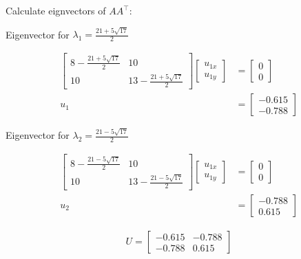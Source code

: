 \documentclass[11pt,letterpaper]{article}
\begin{document}
\begin{enumerate}
Calculate eignvectors of \( AA^\top \):

Eigenvector for \( \lambda_1 = \frac{21+5\sqrt{17}}{2} \)

\begin{align*}
    \begin{bmatrix}
        8-\frac{21+5\sqrt{17}}{2} & 10 \\
        10 & 13-\frac{21+5\sqrt{17}}{2}
    \end{bmatrix}
    \begin{bmatrix}
        u_{1x} \\ u_{1y}
    \end{bmatrix}
    &= \begin{bmatrix}
        0 \\ 0
    \end{bmatrix} \\
    u_1
    &= \begin{bmatrix}
        -0.615 \\ -0.788
    \end{bmatrix}
\end{align*}

Eigenvector for \( \lambda_2 = \frac{21-5\sqrt{17}}{2} \)

\begin{align*}
    \begin{bmatrix}
        8-\frac{21-5\sqrt{17}}{2} & 10 \\
        10 & 13-\frac{21-5\sqrt{17}}{2}
    \end{bmatrix}
    \begin{bmatrix}
        u_{1x} \\ u_{1y}
    \end{bmatrix}
    &= \begin{bmatrix}
        0 \\ 0
    \end{bmatrix} \\
    u_2
    &= \begin{bmatrix}
        -0.788 \\ 0.615
    \end{bmatrix}
\end{align*}

\begin{align*}
U = {\begin{bmatrix}
        -0.615 & -0.788 \\
        -0.788 & 0.615
    \end{bmatrix}}
\end{align*}


\end{enumerate}
\end{document}
